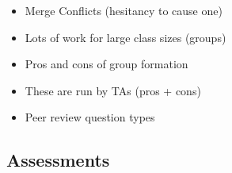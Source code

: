 \documentclass[
  12pt]{article}
\begin{document}
\begin{itemize}
\item
  Merge Conflicts (hesitancy to cause one)
\item
  Lots of work for large class sizes (groups)
\item
  Pros and cons of group formation
\item
  These are run by TAs (pros + cons)
\item
  Peer review question types
\end{itemize}

\hypertarget{assessments}{%
\subsection{Assessments}\label{assessments}}


\renewcommand\refname{Discussion}
  
\end{document}
